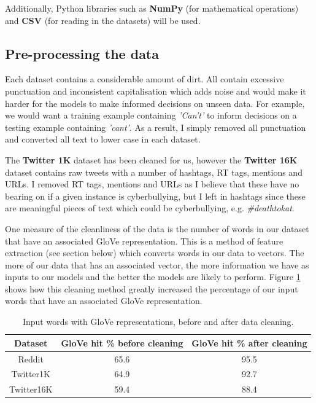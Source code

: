 \documentclass[12pt,a4paper]{article}
\begin{document}
Additionally, Python libraries such as \textbf{NumPy} (for mathematical operations) and \textbf{CSV} (for reading in the datasets) will be used.

\subsection{Pre-processing the data}
Each dataset contains a considerable amount of dirt. All contain excessive punctuation and inconsistent capitalisation which adds noise and would make it harder for the models to make informed decisions on unseen data. For example, we would want a training example containing \textit{'Can't'} to inform decisions on a testing example containing \textit{'cant'}. As a result, I simply removed all punctuation and converted all text to lower case in each dataset. 

The \textbf{Twitter 1K} dataset has been cleaned for us, however the \textbf{Twitter 16K} dataset contains raw tweets with a number of hashtags, RT tags, mentions and URLs. I removed RT tags, mentions and URLs as I believe that these have no bearing on if a given instance is cyberbullying, but I left in hashtags since these are meaningful pieces of text which could be cyberbullying, e.g. \textit{\#deathtokat}.

One measure of the cleanliness of the data is the number of words in our dataset that have an associated GloVe representation. This is a method of feature extraction (see section below) which converts words in our data to vectors. The more of our data that has an associated vector, the more information we have as inputs to our models and the better the models are likely to perform. Figure \ref{glove} shows how this cleaning method greatly increased the percentage of our input words that have an associated GloVe representation.

\begin{table}[htb]
	\centering
	\caption{Input words with GloVe representations, before and after data cleaning.}
	\vspace*{6pt}
	\label{glove}
	\begin{tabular}{ccc}\hline\hline
		\textbf{Dataset} & \textbf{GloVe hit \% before cleaning} & \textbf{GloVe hit \% after cleaning} \\ \hline
		Reddit & 65.6 & 95.5 \\ 
		Twitter1K & 64.9 & 92.7 \\
		Twitter16K & 59.4 & 88.4 \\
	\end{tabular}
\end{table}
\end{document}
